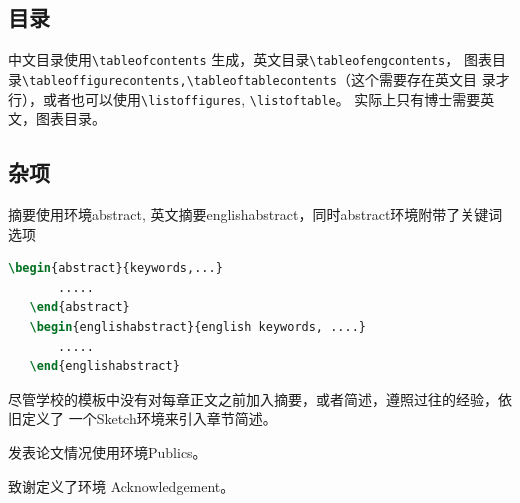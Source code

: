\subsection{目录}
%
\label{sub:contents}
中文目录使用\verb|\tableofcontents| 生成，英文目录\verb|\tableofengcontents|，
图表目录\verb|\tableoffigurecontents,\tableoftablecontents|（这个需要存在英文目
录才行），或者也可以使用\verb|\listoffigures|, \verb|\listoftable|。
实际上只有博士需要英文，图表目录。

\subsection{杂项}
%
\label{sub:others}
摘要使用环境abstract, 英文摘要englishabstract，同时abstract环境附带了关键词选项
\begin{lstlisting}[language=TeX]
   \begin{abstract}{keywords,...}
       .....
   \end{abstract} 
   \begin{englishabstract}{english keywords, ....}
       .....
   \end{englishabstract}
\end{lstlisting}

尽管学校的模板中没有对每章正文之前加入摘要，或者简述，遵照过往的经验，依旧定义了
一个Sketch环境来引入章节简述。

发表论文情况使用环境Publics。

致谢定义了环境 Acknowledgement。

